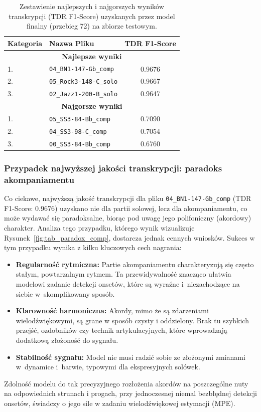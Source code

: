 \begin{table}[H]
    \centering
    \caption{Zestawienie najlepszych i najgorszych wyników transkrypcji (TDR F1-Score) uzyskanych przez model finalny (przebieg 72) na zbiorze testowym.}
    \label{tab:najlepsze_najgorsze_przypadki}
    \begin{tabular}{|l|l|c|}
        \hline
        \textbf{Kategoria} & \textbf{Nazwa Pliku} & \textbf{TDR F1-Score} \\ \hline
        \multicolumn{3}{|c|}{\textbf{Najlepsze wyniki}} \\ \hline
        1. & \texttt{04\_BN1-147-Gb\_comp} & 0.9676 \\
        2. & \texttt{05\_Rock3-148-C\_solo} & 0.9667 \\
        3. & \texttt{02\_Jazz1-200-B\_solo} & 0.9647 \\ \hline
        \multicolumn{3}{|c|}{\textbf{Najgorsze wyniki}} \\ \hline
        1. & \texttt{05\_SS3-84-Bb\_comp} & 0.7090 \\
        2. & \texttt{04\_SS3-98-C\_comp} & 0.7054 \\
        3. & \texttt{00\_SS3-84-Bb\_comp} & 0.6760 \\ \hline
    \end{tabular}
\end{table}


\subsubsection{Przypadek najwyższej jakości transkrypcji: paradoks akompaniamentu}
\label{sssec:analiza_najlepszy}

Co ciekawe, najwyższą jakość transkrypcji dla pliku \texttt{04\_BN1-147-Gb\_comp} (TDR F1-Score: 0.9676) uzyskano nie dla partii solowej, lecz dla akompaniamentu, co może wydawać się paradoksalne, biorąc pod uwagę jego polifoniczny (akordowy) charakter. Analiza tego przypadku, którego wynik wizualizuje Rysunek~\ref{fig:tab_paradox_comp}, dostarcza jednak cennych wniosków. Sukces w tym przypadku wynika z kilku kluczowych cech nagrania:
\begin{itemize}
    \item \textbf{Regularność rytmiczna:} Partie akompaniamentu charakteryzują się często stałym, powtarzalnym rytmem. Ta przewidywalność znacząco ułatwia modelowi zadanie detekcji onsetów, które są wyraźne i~niezachodzące na siebie w~skomplikowany sposób.
    \item \textbf{Klarowność harmoniczna:} Akordy, mimo że są zdarzeniami wielodźwiękowymi, są grane w sposób czysty i oddzielony. Brak tu szybkich przejść, ozdobników czy technik artykulacyjnych, które wprowadzają dodatkową złożoność do sygnału.
    \item \textbf{Stabilność sygnału:} Model nie musi radzić sobie ze złożonymi zmianami w~dynamice i~barwie, typowymi dla ekspresyjnych solówek.
\end{itemize}
Zdolność modelu do tak precyzyjnego rozłożenia akordów na poszczególne nuty na odpowiednich strunach i progach, przy jednoczesnej niemal bezbłędnej detekcji onsetów, świadczy o jego sile w zadaniu wielodźwiękowej estymacji (MPE).

